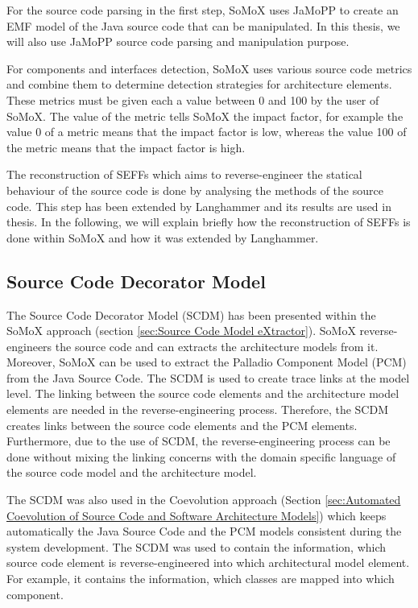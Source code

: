 For the source code parsing in the first step, SoMoX uses JaMoPP to create an EMF model of the Java source code that can be manipulated. In this thesis, we will also use JaMoPP source code parsing and manipulation purpose.

For components and interfaces detection, SoMoX uses various source code metrics and combine them to determine detection strategies for architecture elements. These metrics must be given each a value between 0 and 100 by the user of SoMoX. The value of the metric tells SoMoX the impact factor, for example the value 0 of a metric means that the impact factor is low, whereas the value 100 of the metric means that the impact factor is high. 

The reconstruction of SEFFs which aims to reverse-engineer the statical behaviour of the source code is done by analysing the methods of the source code. This step has been extended by Langhammer \cite{langhammer2017automated} and its results are used in thesis. In the following, we will explain briefly how the reconstruction of SEFFs is done within SoMoX and how it was extended by Langhammer.
\subsection{Source Code Decorator Model}
\label{sec:Source Code Decorator Model}

The Source Code Decorator Model (SCDM) has been presented within the SoMoX approach (section \ref{sec:Source Code Model eXtractor}).  SoMoX reverse-engineers the source code and can extracts the architecture models from it. Moreover, SoMoX can be used to extract the Palladio Component Model (PCM) from the Java Source Code. The SCDM is used to create trace links at the model level. The linking between the source code elements and the architecture model elements are needed in the reverse-engineering process. Therefore, the SCDM creates links between the source code elements and the PCM elements. Furthermore, due to the use of SCDM, the reverse-engineering process can be done without mixing the linking concerns with the domain specific language of the source code model and the architecture model.

The SCDM was also used in the Coevolution approach (Section \ref{sec:Automated Coevolution of Source Code and Software Architecture Models}) which keeps automatically the Java Source Code and the PCM models consistent during the system development. The SCDM was used to contain the information, which source code element is reverse-engineered into which architectural model element. For example, it contains the information, which classes are mapped into which component.

